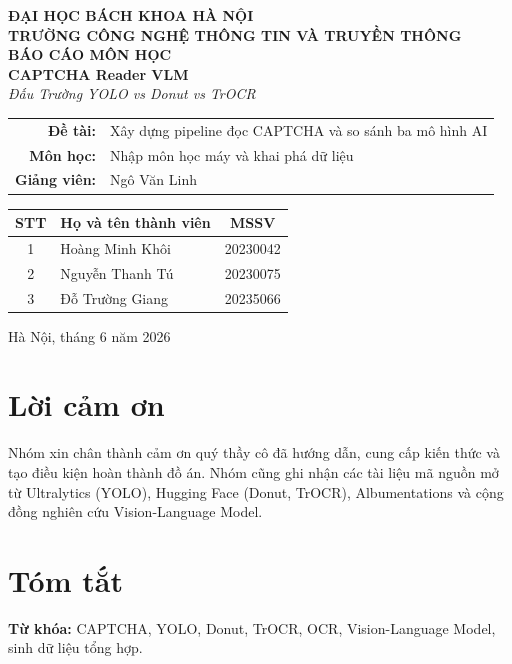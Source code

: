 \documentclass[a4paper,12pt]{report}
\begin{document}
\begin{titlepage}
  \centering
  \vspace*{1cm}
  {\Large \textbf{ĐẠI HỌC BÁCH KHOA HÀ NỘI}}\\[0.5cm]
  {\large \textbf{TRƯỜNG CÔNG NGHỆ THÔNG TIN VÀ TRUYỀN THÔNG}}\\[2cm]

  {\huge \textbf{BÁO CÁO MÔN HỌC}}\\[0.5cm]
  {\LARGE \textbf{CAPTCHA Reader VLM}}\\[0.3cm]
  {\large \textit{Đấu Trường YOLO vs Donut vs TrOCR}}\\[2cm]

  \begin{tabular}{rl}
    \textbf{Đề tài:} & Xây dựng pipeline đọc CAPTCHA và so sánh ba mô hình AI \\
    \textbf{Môn học:}  & Nhập môn học máy và khai phá dữ liệu \\
    \textbf{Giảng viên:} & Ngô Văn Linh \\
  \end{tabular}

  \vfill
  \begin{tabular}{clc}
    \toprule
    \textbf{STT} & \textbf{Họ và tên thành viên} & \textbf{MSSV} \\
    \midrule
    1 & Hoàng Minh Khôi  & 20230042 \\
    2 & Nguyễn Thanh Tú  & 20230075 \\
    3 & Đỗ Trường Giang  & 20235066 \\
    \bottomrule
  \end{tabular}

  \vspace{1.5cm}
  {\large Hà Nội, tháng 6 năm 2026}
\end{titlepage}

\chapter*{Lời cảm ơn}
Nhóm xin chân thành cảm ơn quý thầy cô đã hướng dẫn, cung cấp kiến thức và tạo điều kiện hoàn thành đồ án. Nhóm cũng ghi nhận các tài liệu mã nguồn mở từ Ultralytics (YOLO), Hugging Face (Donut, TrOCR), Albumentations và cộng đồng nghiên cứu Vision-Language Model.

\chapter*{Tóm tắt}
\textbf{Từ khóa:} CAPTCHA, YOLO, Donut, TrOCR, OCR, Vision-Language Model, sinh dữ liệu tổng hợp.
\end{document}
